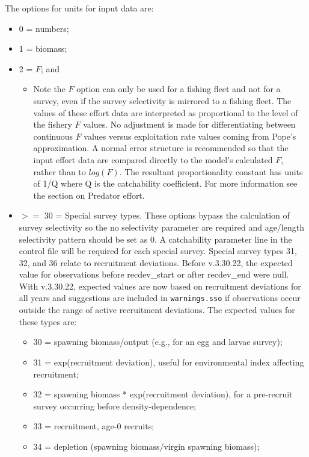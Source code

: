 \hypertarget{IndexUnits}{}
The options for units for input data are:	
\begin{itemize}
	\item 0  = numbers;
	\item 1  = biomass; 
	\item 2  = $F$; and
		\begin{itemize}
			\item Note the $F$ option can only be used for a fishing fleet and not for a survey, even if the survey selectivity is mirrored to a fishing fleet. The values of these effort data are interpreted as proportional to the level of the fishery $F$ values. No adjustment is made for differentiating between continuous $F$ values versus exploitation rate values coming from Pope's approximation. A normal error structure is recommended so that the input effort data are compared directly to the model's calculated $F$, rather than to $log(F)$. The resultant proportionality constant has units of 1/Q where Q is the catchability coefficient. For more information see the section on \hypertarget{PredEffort}{Predator effort}.	
		\end{itemize}
	\item \hypertarget{SpecialSurvey}{} $>=$ 30 = Special survey types. These options bypass the calculation of survey selectivity so the no selectivity parameter are required and age/length selectivity pattern should be set as 0. A catchability parameter line in the control file will be required for each special survey. Special survey types 31, 32, and 36 relate to recruitment deviations. Before v.3.30.22, the expected value for observations before recdev\_start or after recdev\_end were null. With v.3.30.22, expected values are now based on recruitment deviations for all years and suggestions are included in \texttt{warnings.sso} if observations occur outside the range of active recruitment deviations. The expected values for these types are:
		\begin{itemize}
			\item 30 = spawning biomass/output (e.g., for an egg and larvae survey);
			\item 31 = exp(recruitment deviation), useful for environmental index affecting recruitment;
			\item 32 = spawning biomass * exp(recruitment deviation), for a pre-recruit survey occurring before density-dependence;
			\item 33 = recruitment, age-0 recruits;
			\item 34 = depletion (spawning biomass/virgin spawning biomass);

\end{itemize}
\end{itemize}
